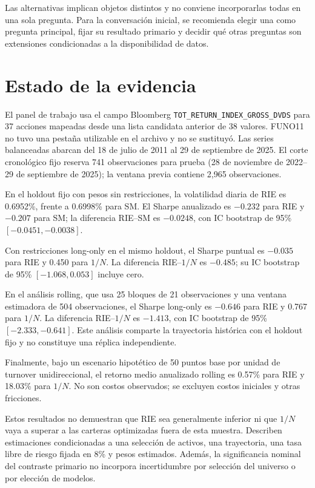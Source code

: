 \documentclass[11pt]{article}
\begin{document}
Las alternativas implican objetos distintos y no conviene incorporarlas
todas en una sola pregunta. Para la conversación inicial, se recomienda
elegir una como pregunta principal, fijar su resultado primario y decidir qué
otras preguntas son extensiones condicionadas a la disponibilidad de datos.

\section{Estado de la evidencia}

El panel de trabajo usa el campo Bloomberg
\texttt{TOT\_RETURN\_INDEX\_GROSS\_DVDS} para 37 acciones mapeadas desde una
lista candidata anterior de 38 valores. FUNO11 no tuvo una pestaña utilizable
en el archivo y no se sustituyó. Las series balanceadas abarcan del 18 de
julio de 2011 al 29 de septiembre de 2025. El corte cronológico fijo reserva
741 observaciones para prueba (28 de noviembre de 2022--29 de septiembre de
2025); la ventana previa contiene 2,965 observaciones.

En el holdout fijo con pesos sin restricciones, la volatilidad diaria de RIE
es 0.6952\%, frente a 0.6998\% para SM. El Sharpe anualizado es $-0.232$ para
RIE y $-0.207$ para SM; la diferencia RIE--SM es $-0.0248$, con IC bootstrap
de 95\% $[-0.0451,-0.0038]$.

Con restricciones long-only en el mismo holdout, el Sharpe puntual es
$-0.035$ para RIE y 0.450 para $1/N$. La diferencia RIE--$1/N$ es $-0.485$;
su IC bootstrap de 95\% $[-1.068,0.053]$ incluye cero.

En el análisis rolling, que usa 25 bloques de 21 observaciones y una ventana
estimadora de 504 observaciones, el Sharpe long-only es $-0.646$ para RIE y
0.767 para $1/N$. La diferencia RIE--$1/N$ es $-1.413$, con IC bootstrap de
95\% $[-2.333,-0.641]$. Este análisis comparte la trayectoria histórica con
el holdout fijo y no constituye una réplica independiente.

Finalmente, bajo un escenario hipotético de 50 puntos base por unidad de
turnover unidireccional, el retorno medio anualizado rolling es 0.57\% para
RIE y 18.03\% para $1/N$. No son costos observados; se excluyen costos
iniciales y otras fricciones.

Estos resultados no demuestran que RIE sea generalmente inferior ni que
$1/N$ vaya a superar a las carteras optimizadas fuera de esta muestra.
Describen estimaciones condicionadas a una selección de activos, una
trayectoria, una tasa libre de riesgo fijada en 8\% y pesos estimados. Además,
la significancia nominal del contraste primario no incorpora incertidumbre
por selección del universo o por elección de modelos.
\end{document}
